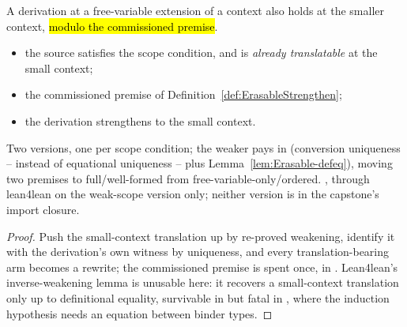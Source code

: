 \begin{theorem}
\label{thm:Erases-strengthen_fvlift}
\leanok
{}
 A derivation at a free-variable extension of a context also holds at the smaller context, \hl{modulo the commissioned premise}.
\begin{itemize}
\item {} the source satisfies the scope condition, and is \emph{already translatable} at the small context;
\item {} the commissioned premise of Definition~\ref{def:ErasableStrengthen};
\item {} the derivation strengthens to the small context.
\end{itemize}
 Two versions, one per scope condition; the weaker pays in  (conversion
uniqueness -- instead of equational uniqueness -- plus Lemma~\ref{lem:Erasable-defeq}), moving
two premises to full/well-formed from free-variable-only/ordered.
 \stProved{}, \stInherited{} through lean4lean on the weak-scope version only;
neither version is in the capstone's import closure.
\end{theorem}
\begin{proof}
\leanok
{}
 Push the small-context translation up by re-proved weakening, identify it with the
derivation's own witness by uniqueness, and every translation-bearing arm becomes a rewrite;
the commissioned premise is spent once, in . Lean4lean's inverse-weakening lemma is
unusable here: it recovers a small-context translation only up to definitional equality,
survivable in  but fatal in , where the induction hypothesis needs an
equation between binder types.
\end{proof}

